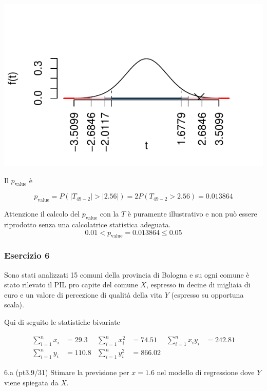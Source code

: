 \documentclass[
  10pt,
]{article}
\begin{document}
\begin{sol}
\begin{center}\includegraphics{www/compito_files/figure-latex/2023-71,-1} \end{center}

Il \(p_{\text{value}}\) è

\[ p_{\text{value}} = P(|T_{49-2}|>|2.56|)=2P(T_{49-2}>2.56)=0.013864 \]

Attenzione il calcolo del \(p_\text{value}\) con la \(T\) è puramente illustrativo e non può essere riprodotto senza una calcolatrice statistica adeguata.\[
 0.01 < p_\text{value}= 0.013864 \leq 0.05 
\]

\end{sol}

\subsubsection{Esercizio 6}\label{esercizio-6}

Sono stati analizzati 15 comuni della provincia di Bologna e su ogni comune è stato rilevato
il PIL pro capite del comune \(X\), espresso in decine di migliaia di euro e un valore di percezione di
qualità della vita \(Y\) (espresso su opportuna scala).

Qui di seguito le statistiche bivariate

\begin{align*}
  \sum_{i=1}^n x_i &= 29.3 &\sum_{i=1}^n x_i^2 &= 74.51 &\sum_{i=1}^n x_i y_i &= 242.81\\
  \sum_{i=1}^n y_i &= 110.8 & \sum_{i=1}^n y_i^2 &= 866.02 &
\end{align*}

6.a (pt\hspace{.1em}3.9/31) Stimare la previsione per \(x=1.6\) nel modello di regressione dove \(Y\) viene spiegata da \(X\).
\end{document}
